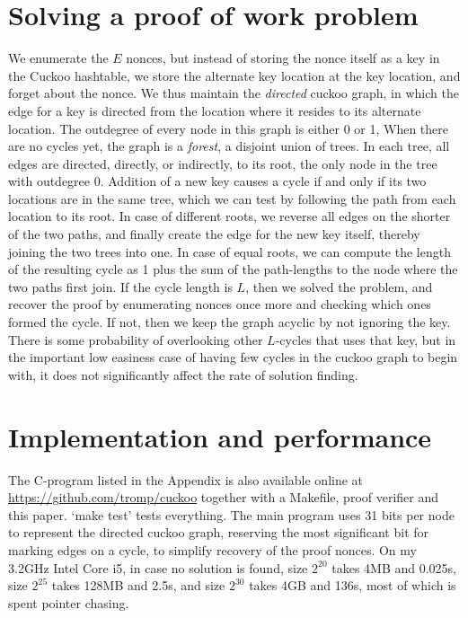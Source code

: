 \documentclass[11pt, oneside]{article}
\begin{document}
\section{Solving a proof of work problem}
We enumerate the $E$ nonces, but instead of storing the nonce itself as a key
in the Cuckoo hashtable, we store the alternate key location at the key location,
and forget about the nonce.
We thus maintain the {\em directed} cuckoo graph, in which the edge for a key
is directed from the location where it resides to its alternate location.
The outdegree of every node in this
graph is either 0 or 1, When there are no cycles yet, the graph is a {\em
forest}, a disjoint union of trees. In each tree, all edges are directed,
directly, or indirectly, to its root,
the only node in the tree with outdegree 0. Addition of a new key causes a
cycle if and only if its two locations are in the same tree, which we can test
by following the path from each location to its root.
In case of different roots, we reverse all edges on the shorter of the two paths,
and finally create the edge for the new key itself, thereby joining the two trees into one.
In case of equal roots, we can compute the length of the resulting cycle as
1 plus the sum of the path-lengths to the node where the two paths first join.
If the cycle length is $L$, then we solved the problem, and recover the proof
by enumerating nonces once more and checking which ones formed the cycle.
If not, then we keep the graph acyclic by not ignoring the key.
There is some probability of overlooking other $L$-cycles
that uses that key, but in the important low easiness case of having few cycles
in the cuckoo graph to begin with, it does not significantly affect
the rate of solution finding.

\section{Implementation and performance}
The C-program listed in the Appendix is also available online at
\url{https://github.com/tromp/cuckoo} together with a Makefile,
proof verifier and this paper. `make test' tests everything.
The main program uses 31 bits per node to represent the
directed cuckoo graph, reserving the most significant bit
for marking edges on a cycle, to simplify recovery of the proof nonces.
On my 3.2GHz Intel Core i5, in case no solution is found, size $2^{20}$ takes 4MB and 0.025s, size
$2^{25}$ takes 128MB and 2.5s, and size $2^{30}$ takes 4GB and 136s,
most of which is spent pointer chasing.
\end{document}
